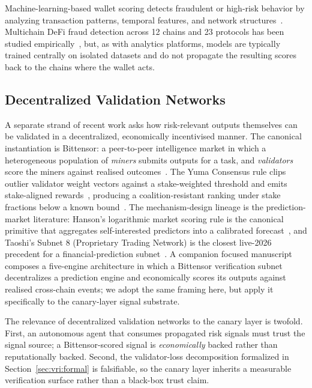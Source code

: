 \documentclass[journal]{IEEEtran}
\begin{document}
Machine-learning-based wallet scoring detects fraudulent or high-risk
behavior by analyzing transaction patterns, temporal features, and
network structures~\cite{MishraP25,palaiokrassas2023multichain}.
Multichain DeFi fraud detection across 12 chains and 23 protocols has
been studied empirically~\cite{palaiokrassas2023multichain}, but, as
with analytics platforms, models are typically trained centrally on
isolated datasets and do not propagate the resulting scores back to
the chains where the wallet acts.

\subsection{Decentralized Validation Networks}\label{sec:rw:dvn}

A separate strand of recent work asks how risk-relevant outputs
themselves can be validated in a decentralized, economically incentivised
manner. The canonical instantiation is Bittensor: a peer-to-peer
intelligence market in which a heterogeneous population of \emph{miners}
submits outputs for a task, and \emph{validators} score the miners
against realised
outcomes~\cite{rao2021bittensor,steeves2022incentivizing}. The Yuma
Consensus rule clips outlier validator weight vectors against a
stake-weighted threshold and emits stake-aligned
rewards~\cite{opentensor2024yuma}, producing a coalition-resistant
ranking under stake fractions below a known
bound~\cite{steeves2022incentivizing}. The mechanism-design lineage is
the prediction-market literature: Hanson's logarithmic market scoring
rule is the canonical primitive that aggregates self-interested
predictors into a calibrated forecast~\cite{hanson2003combinatorial},
and Taoshi's Subnet 8 (Proprietary Trading Network) is the closest
live-2026 precedent for a financial-prediction
subnet~\cite{taoshi2024ptn}. A companion focused
manuscript~\cite{magableh2026agenticiov} composes a five-engine
architecture in which a Bittensor verification subnet decentralizes a
prediction engine and economically scores its outputs against
realised cross-chain events; we adopt the same framing here, but apply
it specifically to the canary-layer signal substrate.

The relevance of decentralized validation networks to the canary layer
is twofold. First, an autonomous agent that consumes propagated risk
signals must trust the signal source; a Bittensor-scored signal is
\emph{economically} backed rather than reputationally backed. Second,
the validator-loss decomposition formalized in
Section~\ref{sec:vri:formal} is falsifiable, so the canary layer
inherits a measurable verification surface rather than a black-box
trust claim.
\end{document}
